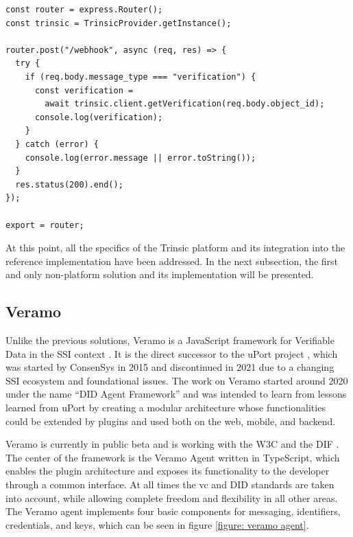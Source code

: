     \begin{lstlisting}[style=ES6, caption=Trinsic webhook for verification result, label={listing: trinsic webhook}]
const router = express.Router();
const trinsic = TrinsicProvider.getInstance();

router.post("/webhook", async (req, res) => {
  try {
    if (req.body.message_type === "verification") {
      const verification = 
        await trinsic.client.getVerification(req.body.object_id);
      console.log(verification);
    }
  } catch (error) {
    console.log(error.message || error.toString());
  }
  res.status(200).end();
});

export = router;
\end{lstlisting}

    At this point, all the specifics of the Trinsic platform and its integration into the reference implementation have been addressed. In the next subsection, the first and only non-platform solution and its implementation will be presented.
    
    \subsection{Veramo}\label{subsection: veramo}
    
    Unlike the previous solutions, Veramo is a JavaScript framework for Verifiable Data in the SSI context \cite{veramo_veramo_2021-1}. It is the direct successor to the uPort project \cite{uport_uport_2021}, which was started by ConsenSys in 2015 and discontinued in 2021 due to a changing SSI ecosystem and foundational issues. The work on Veramo started around 2020 under the name “DID Agent Framework” and was intended to learn from lessons learned from uPort by creating a modular architecture whose functionalities could be extended by plugins and used both on the web, mobile, and backend. \cite{uport_veramo_2021}
    
    Veramo is currently in public beta and is working with the W3C and the DIF \cite{veramo_veramo_2021-1}. The center of the framework is the Veramo Agent written in TypeScript, which enables the plugin architecture and exposes its functionality to the developer through a common interface. At all times the \ac{vc} and \ac{DID} standards are taken into account, while allowing complete freedom and flexibility in all other areas. The Veramo agent implements four basic components for messaging, identifiers, credentials, and keys, which can be seen in figure \ref{figure: veramo agent}. \cite{veramo_veramo_2021-2}
    
